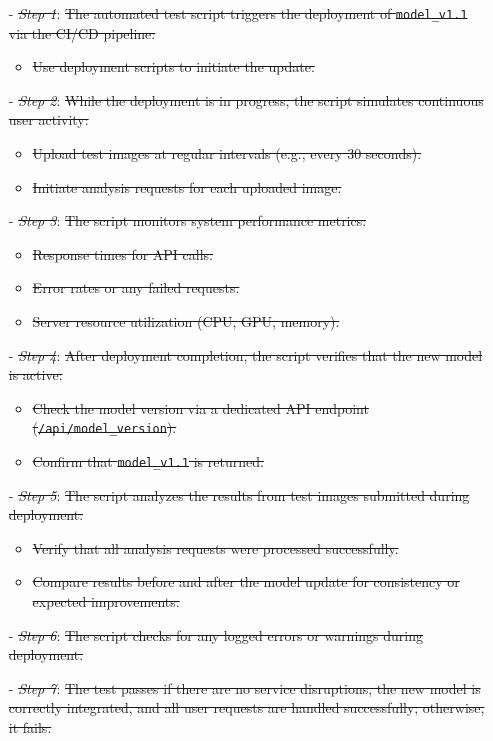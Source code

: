 \documentclass[12pt, titlepage]{article}
\begin{document}
\begin{enumerate}
\begin{enumerate}
\begin{itemize}
  \item[-] \textit{\sout{Step 1}}: \sout{The automated test script triggers the deployment of \texttt{model\_v1.1} via the CI/CD pipeline:}
    \begin{itemize}
      \item \sout{Use deployment scripts to initiate the update.}
    \end{itemize}
  \item[-] \textit{\sout{Step 2}}: \sout{While the deployment is in progress, the script simulates continuous user activity:}
    \begin{itemize}
      \item \sout{Upload test images at regular intervals (e.g., every 30 seconds).}
      \item \sout{Initiate analysis requests for each uploaded image.}
    \end{itemize}
  \item[-] \textit{\sout{Step 3}}: \sout{The script monitors system performance metrics:}
    \begin{itemize}
      \item \sout{Response times for API calls.}
      \item \sout{Error rates or any failed requests.}
      \item \sout{Server resource utilization (CPU, GPU, memory).}
    \end{itemize}
  \item[-] \textit{\sout{Step 4}}: \sout{After deployment completion, the script verifies that the new model is active:}
    \begin{itemize}
      \item \sout{Check the model version via a dedicated API endpoint (\texttt{/api/model\_version}).}
      \item \sout{Confirm that \texttt{model\_v1.1} is returned.}
    \end{itemize}
  \item[-] \textit{\sout{Step 5}}: \sout{The script analyzes the results from test images submitted during deployment:}
    \begin{itemize}
      \item \sout{Verify that all analysis requests were processed successfully.}
      \item \sout{Compare results before and after the model update for consistency or expected improvements.}
    \end{itemize}
  \item[-] \textit{\sout{Step 6}}: \sout{The script checks for any logged errors or warnings during deployment.}
  \item[-] \textit{\sout{Step 7}}: \sout{The test passes if there are no service disruptions, the new model is correctly integrated, and all user requests are handled successfully; otherwise, it fails.}
\end{itemize}



\end{enumerate}
\end{enumerate}
\end{document}
